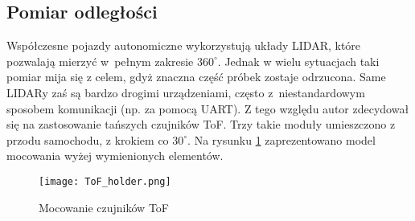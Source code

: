    


    \subsection{Pomiar odległości}
        Współczesne pojazdy autonomiczne wykorzystują układy LIDAR, które pozwalają mierzyć w~pełnym zakresie $360^\circ$.
        Jednak w wielu sytuacjach taki pomiar mija się z celem, gdyż znaczna część próbek zostaje odrzucona.
        Same LIDARy zaś są bardzo drogimi urządzeniami, często z~niestandardowym sposobem komunikacji (np. za pomocą UART).
        Z tego względu autor zdecydował się na zastosowanie tańszych czujników ToF.
        Trzy takie moduły umieszczono z przodu samochodu, z krokiem co $30^\circ$.
        Na rysunku \ref{fig:ToF_holder} zaprezentowano model mocowania wyżej wymienionych elementów.

        \begin{figure}[!ht]
            \centering
            \texttt{[image: ToF\_holder.png]}
            \caption{Mocowanie czujników ToF}
            \label{fig:ToF_holder}
        \end{figure}
